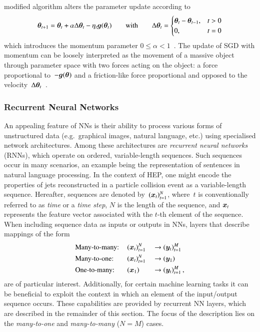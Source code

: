 modified algorithm alters the parameter update according to
\begin{align*}
  \bm{\theta}_{t + 1} = \bm{\theta}_{t}
  + \alpha \Delta\bm{\theta}_{t} - \eta_t \bm{g}(\bm{\theta}_{t})
  \qquad \text{with} \qquad
  \Delta\bm{\theta}_{t} =
  \begin{cases}
    \bm{\theta}_{t} - \bm{\theta}_{t - 1}, & t > 0 \\
    0,                                         & t = 0
  \end{cases}
\end{align*}
which introduces the momentum parameter
$0 \leq \alpha < 1$~\cite{rumelhart1986learning,Goodfellow-et-al-2016}. The
update of SGD with momentum can be loosely interpreted as the movement of a
massive object through parameter space with two forces acting on the object: a
force proportional to~$-\bm{g}(\bm{\theta})$ and a friction-like force
proportional and opposed to the
velocity~$\Delta\bm{\theta}_{t}$~\cite{Goodfellow-et-al-2016}.


\subsubsection{Recurrent Neural Networks}%
\label{sec:rnn}

An appealing feature of NNs is their ability to process various forms of
unstructured data (e.g.~graphical images, natural language, etc.) using
specialised network architectures. Among these architectures are \emph{recurrent
  neural networks} (RNNs), which operate on ordered, variable-length
sequences. Such sequences occur in many scenarios, an example being the
representation of sentences in natural language processing. In the context of
HEP, one might encode the properties of jets reconstructed in a particle
collision event as a variable-length sequence. Hereafter, sequences are denoted
by~$(\bm{x}_{t})_{t = 1}^{N}$, where~$t$ is conventionally referred to as
\emph{time} or a \emph{time step}, $N$ is the length of the sequence, and
$\bm{x}_{t}$ represents the feature vector associated with the $t$-th element
of the sequence. When including sequence data as inputs or outputs in NNs,
layers that describe mappings of the form
\begin{alignat*}{3}
  &\text{Many-to-many:}\,
  &&(\bm{x}_{t})_{t = 1}^{N} &&\rightarrow (\bm{y}_{t})_{t = 1}^{M} \\
  &\text{Many-to-one:}\,
  &&(\bm{x}_{t})_{t = 1}^{N} &&\rightarrow (\bm{y}_{1}) \\
  &\text{One-to-many:}\,
  &&(\bm{x}_1)              &&\rightarrow (\bm{y}_{t})_{t = 1}^{M} \,\text{,}
\end{alignat*}
are of particular interest. Additionally, for certain machine learning tasks it
can be beneficial to exploit the context in which an element of the input/output
sequence occurs. These capabilities are provided by recurrent NN layers, which
are described in the remainder of this section. The focus of the description
lies on the \emph{many-to-one} and \emph{many-to-many} ($N = M$) cases.

